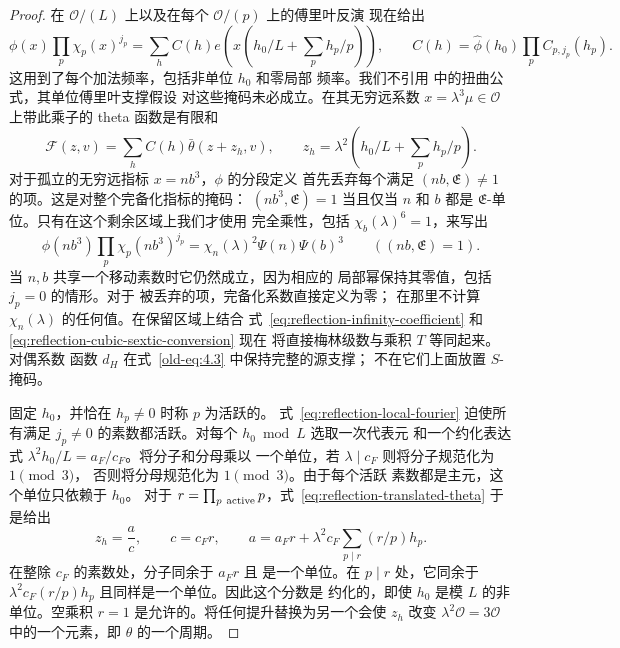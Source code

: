 \documentclass[11pt,a4paper]{article}
\numberwithin{equation}{section}
\numberwithin{figure}{section}
\theoremstyle{definition}
\theoremstyle{remark}
\begin{document}
\begin{proof}
在 $\mathcal O/(L)$ 上以及在每个 $\mathcal O/(p)$ 上的傅里叶反演
现在给出
\[
 \phi(x)\prod_p\chi_p(x)^{j_p}
  =\sum_h C(h)e\!\left(x\left(h_0/L+\sum_p h_p/p\right)\right),
 \qquad C(h)=\widehat\phi(h_0)\prod_pC_{p,j_p}(h_p).
\]
这用到了每个加法频率，包括非单位 $h_0$ 和零局部
频率。我们不引用
\cite[Lemma~5.2 and Corollary~5.1]{DR} 中的扭曲公式，其单位傅里叶支撑假设
对这些掩码未必成立。在其无穷远系数 $x=\lambda^3\mu\in\mathcal O$ 上带此乘子的 theta 函数是有限和
\begin{equation}\label{eq:reflection-translated-theta}
 \mathcal F(z,v)=\sum_hC(h)\bar\theta(z+z_h,v),\qquad
 z_h=\lambda^2\left(h_0/L+\sum_p h_p/p\right).
\end{equation}
对于孤立的无穷远指标 $x=nb^3$，$\phi$ 的分段定义
首先丢弃每个满足 $(nb,\mathfrak E)\ne1$ 的项。这是对整个完备化指标的掩码：
$(nb^3,\mathfrak E)=1$ 当且仅当 $n$
和 $b$ 都是 $\mathfrak E$-单位。只有在这个剩余区域上我们才使用
完全乘性，包括 $\chi_b(\lambda)^6=1$，来写出
\[
 \phi(nb^3)\prod_p\chi_p(nb^3)^{j_p}
 =\chi_n(\lambda)^2\Psi(n)\Psi(b)^3
 \qquad((nb,\mathfrak E)=1).
\]
当 $n,b$ 共享一个移动素数时它仍然成立，因为相应的
局部幂保持其零值，包括 $j_p=0$ 的情形。对于
被丢弃的项，完备化系数直接定义为零；
在那里不计算 $\chi_n(\lambda)$ 的任何值。在保留区域上结合
式~\eqref{eq:reflection-infinity-coefficient} 和
\eqref{eq:reflection-cubic-sextic-conversion} 现在
将直接梅林级数与乘积 $T$ 等同起来。对偶系数
函数 $d_H$ 在式~\eqref{old-eq:4.3} 中保持完整的源支撑；
不在它们上面放置 $S$-掩码。

固定 $h_0$，并恰在 $h_p\ne0$ 时称 $p$ 为活跃的。
式~\eqref{eq:reflection-local-fourier} 迫使所有满足
$j_p\ne0$ 的素数都活跃。对每个 $h_0\bmod L$ 选取一次代表元
和一个约化表达式
$\lambda^2h_0/L=a_F/c_F$。将分子和分母乘以
一个单位，若 $\lambda\mid c_F$ 则将分子规范化为 $1\pmod3$，
否则将分母规范化为 $1\pmod3$。由于每个活跃
素数都是主元，这个单位只依赖于 $h_0$。
对于 $r=\prod_{p\ {\rm active}}p$，式~\eqref{eq:reflection-translated-theta}
于是给出
\begin{equation}\label{eq:reflection-cusp-fraction}
 z_h=\frac ac,\qquad c=c_Fr,\qquad
 a=a_Fr+\lambda^2c_F\sum_{p\mid r}(r/p)h_p.
\end{equation}
在整除 $c_F$ 的素数处，分子同余于 $a_Fr$ 且
是一个单位。在 $p\mid r$ 处，它同余于
$\lambda^2c_F(r/p)h_p$ 且同样是一个单位。因此这个分数是
约化的，即使 $h_0$ 是模 $L$ 的非单位。空乘积
$r=1$ 是允许的。将任何提升替换为另一个会使 $z_h$ 改变
$\lambda^2\mathcal O=3\mathcal O$ 中的一个元素，即 $\theta$ 的一个周期。


\end{proof}
\end{document}
